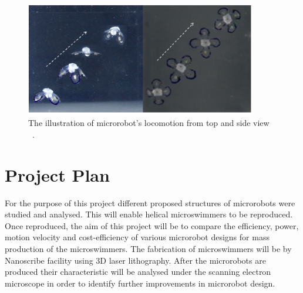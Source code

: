 \documentclass[a4paper,11pt]{article}
\begin{document}
\begin{sloppypar}
\begin{figure}
  \centering
    \includegraphics[width=0.9\textwidth]{jellyfish}
  \caption{ The illustration of microrobot\rq{}s locomotion from top and side view ~\citep{ko2012jellyfish}.}
  \label{jellyfish}
\end{figure}


\section{Project Plan}
For the purpose of this project different proposed structures of microrobots were studied
 and analysed. This will enable helical microswimmers to be reproduced. Once reproduced, the aim of this project will be to compare
 the efficiency, power, motion velocity and cost-efficiency of various microrobot designs for mass production
 of the microswimmers. The fabrication of microswimmers will be by Nanoscribe facility using 3D laser
 lithography. After the microrobots are produced their characteristic will be analysed
 under the scanning electron microscope in order to identify further improvements in microrobot design. 





\nocite{vogtmann2013modeling}
\nocite{zeeshan2013hybrid}
\nocite{diller2013independent}
%




\end{sloppypar}
\end{document}

